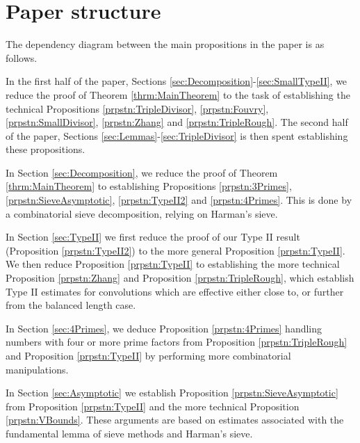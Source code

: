 \documentclass[10pt]{amsart}
\theoremstyle{plain}
\numberwithin{equation}{section}
\begin{document}
\section{Paper structure}
%
%
%
%
The dependency diagram between the main propositions in the paper is as follows.
%
%
%
%
  \begin{center}
   \end{center}
%
%
%
In the first half of the paper, Sections \ref{sec:Decomposition}-\ref{sec:SmallTypeII}, we reduce the proof of Theorem \ref{thrm:MainTheorem} to the task of establishing the technical Propositions \ref{prpstn:TripleDivisor}, \ref{prpstn:Fouvry}, \ref{prpstn:SmallDivisor}, \ref{prpstn:Zhang} and \ref{prpstn:TripleRough}. The second half of the paper, Sections \ref{sec:Lemmas}-\ref{sec:TripleDivisor} is then spent establishing these propositions.

In Section \ref{sec:Decomposition}, we reduce the proof of Theorem \ref{thrm:MainTheorem} to establishing Propositions \ref{prpstn:3Primes}, \ref{prpstn:SieveAsymptotic}, \ref{prpstn:TypeII2} and \ref{prpstn:4Primes}. This is done by a combinatorial sieve decomposition, relying on Harman's sieve.

In Section \ref{sec:TypeII} we first reduce the proof of our Type II result (Proposition \ref{prpstn:TypeII2}) to the more general Proposition \ref{prpstn:TypeII}. We then reduce Proposition \ref{prpstn:TypeII} to establishing the more technical Proposition \ref{prpstn:Zhang} and Proposition \ref{prpstn:TripleRough}, which establish Type II estimates for convolutions which are effective either close to, or further from the balanced length case.

In Section \ref{sec:4Primes}, we deduce Proposition \ref{prpstn:4Primes} handling numbers with four or more prime factors from Proposition \ref{prpstn:TripleRough} and Proposition \ref{prpstn:TypeII} by performing more combinatorial manipulations.

In Section \ref{sec:Asymptotic} we establish Proposition %
\ref{prpstn:SieveAsymptotic} from Proposition \ref{prpstn:TypeII} and the more technical Proposition \ref{prpstn:VBounds}. These arguments are based on estimates associated with the fundamental lemma of sieve methods and Harman's sieve.
\end{document}
